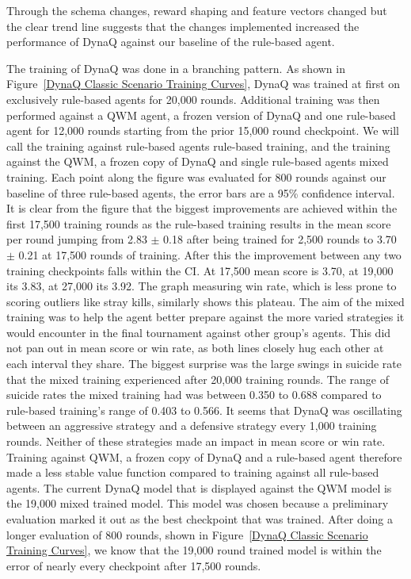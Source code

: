 \documentclass[article, 10pt]{IEEEtran}
\begin{document}
Through the schema changes, reward shaping and feature vectors changed but the clear trend line suggests that the changes implemented increased the performance of DynaQ against our baseline of the rule-based agent.


The training of DynaQ was done in a branching pattern. As shown in Figure~\ref{DynaQ Classic Scenario Training Curves}, DynaQ was trained at first on exclusively rule-based agents for 20,000 rounds. Additional training was then performed against a QWM agent, a frozen version of DynaQ and one rule-based agent for 12,000 rounds starting from the prior 15,000 round checkpoint. We will call the training against rule-based agents rule-based training, and the training against the QWM, a frozen copy of DynaQ and single rule-based agents mixed training. Each point along the figure was evaluated for 800 rounds against our baseline of three rule-based agents, the error bars are a 95\% confidence interval. It is clear from the figure that the biggest improvements are achieved within the first 17,500 training rounds as the rule-based training results in the mean score per round jumping from 2.83 $\pm$ 0.18 after being trained for 2,500 rounds to 3.70 $\pm$ 0.21 at 17,500 rounds of training. After this the improvement between any two training checkpoints falls within the CI. At 17,500 mean score is 3.70, at 19,000 its 3.83, at 27,000 its 3.92. The graph measuring win rate, which is less prone to scoring outliers like stray kills, similarly shows this plateau. The aim of the mixed training was to help the agent better prepare against the more varied strategies it would encounter in the final tournament against other group's agents. This did not pan out in mean score or win rate, as both lines closely hug each other at each interval they share. The biggest surprise was the large swings in suicide rate that the mixed training experienced after 20,000 training rounds. The range of suicide rates the mixed training had was between 0.350 to 0.688 compared to rule-based training's range of 0.403 to 0.566. It seems that DynaQ was oscillating between an aggressive strategy and a defensive strategy every 1,000 training rounds. Neither of these strategies made an impact in mean score or win rate. Training against QWM, a frozen copy of DynaQ and a rule-based agent therefore made a less stable value function compared to training against all rule-based agents. The current DynaQ model that is displayed against the QWM model is the 19,000 mixed trained model. This model was chosen because a preliminary evaluation marked it out as the best checkpoint that was trained. After doing a longer evaluation of 800 rounds, shown in Figure~\ref{DynaQ Classic Scenario Training Curves}, we know that the 19,000 round trained model is within the error of nearly every checkpoint after 17,500 rounds. 
\end{document}
